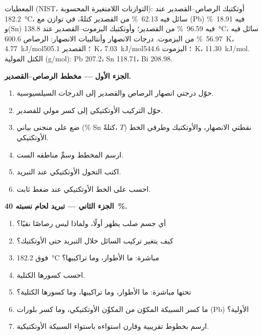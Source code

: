 \begin{problem}
\label{pb:b2:solid-liquid-diagrams:1}
المعطيات (NIST، التوازنات اللامتغيرة المحسوبة): أوتكتيك الرصاص--القصدير عند
\qty{182.2}{\degreeCelsius}، سائل فيه 62.13~\% من القصدير كتلةً، في توازن مع
(Pb) فيه 18.91~\% و(Sn) فيه 96.59~\% من القصدير؛ وأوتكتيك البزموت--القصدير عند
\qty{138.8}{\degreeCelsius}، سائل فيه 56.97~\% من البزموت. درجات الانصهار
وأنتالبيات الانصهار: الرصاص \qty{600.6}{K}، \qty{4.77}{kJ/mol}؛ القصدير
\qty{505.1}{K}، \qty{7.03}{kJ/mol}؛ البزموت \qty{544.6}{K}، \qty{11.30}{kJ/mol}.
الكتل المولية (\unit{g/mol}): Pb 207.2، Sn 118.71، Bi 208.98.

\medskip
\noindent\textbf{الجزء الأول --- مخطط الرصاص--القصدير.}
\begin{enumerate}
  \item حوّل درجتي انصهار الرصاص والقصدير إلى الدرجات السيلسيوسية.
  \item حوّل التركيب الأوتكتيكي إلى كسر مولي للقصدير.
  \item ضع على منحنى بياني (\% Sn كتلةً، $T$) نقطتي الانصهار، والأوتكتيك
        وطرفي الخط الأوتكتيكي.
  \item ارسم المخطط وسمِّ مناطقه الست.
  \item اكتب التحول الأوتكتيكي عند التبريد.
  \item احسب  على الخط الأوتكتيكي عند ضغط ثابت.
\end{enumerate}

\medskip
\noindent\textbf{الجزء الثاني --- تبريد لحام نسبته 40~\%.}
\begin{enumerate}[resume]
  \item أي جسم صلب يظهر أولًا، ولماذا ليس رصاصًا نقيًا؟
  \item كيف يتغير تركيب السائل خلال التبريد حتى
        الأوتكتيك؟
  \item فوق \qty{182.2}{\degreeCelsius} مباشرة: ما الأطوار، وما
        تراكيبها؟
  \item احسب كسورها الكتلية.
  \item تحتها مباشرة: ما الأطوار، وما تراكيبها، وما كسورها
        الكتلية؟
  \item ما كسر السبيكة المكوّن من المكوِّن الأوتكتيكي، وما
        كسر بلورات (Pb) الأولية؟
  \item ارسم بخطوط تقريبية  وقارن استواءه باستواء
        السبيكة الأوتكتيكية.
\end{enumerate}


\end{problem}
